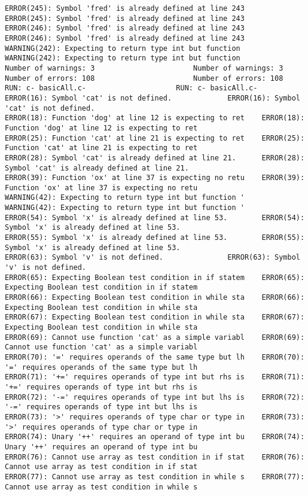 \documentclass[12pt]{book}
\begin{document}
\begin{lstlisting}
ERROR(245): Symbol 'fred' is already defined at line 243	ERROR(245): Symbol 'fred' is already defined at line 243
ERROR(246): Symbol 'fred' is already defined at line 243	ERROR(246): Symbol 'fred' is already defined at line 243
WARNING(242): Expecting to return type int but function 	WARNING(242): Expecting to return type int but function 
Number of warnings: 3						Number of warnings: 3
Number of errors: 108						Number of errors: 108
RUN: c- basicAll.c-						RUN: c- basicAll.c-
ERROR(16): Symbol 'cat' is not defined.				ERROR(16): Symbol 'cat' is not defined.
ERROR(18): Function 'dog' at line 12 is expecting to ret	ERROR(18): Function 'dog' at line 12 is expecting to ret
ERROR(25): Function 'cat' at line 21 is expecting to ret	ERROR(25): Function 'cat' at line 21 is expecting to ret
ERROR(28): Symbol 'cat' is already defined at line 21.		ERROR(28): Symbol 'cat' is already defined at line 21.
ERROR(39): Function 'ox' at line 37 is expecting no retu	ERROR(39): Function 'ox' at line 37 is expecting no retu
WARNING(42): Expecting to return type int but function '	WARNING(42): Expecting to return type int but function '
ERROR(54): Symbol 'x' is already defined at line 53.		ERROR(54): Symbol 'x' is already defined at line 53.
ERROR(55): Symbol 'x' is already defined at line 53.		ERROR(55): Symbol 'x' is already defined at line 53.
ERROR(63): Symbol 'v' is not defined.				ERROR(63): Symbol 'v' is not defined.
ERROR(65): Expecting Boolean test condition in if statem	ERROR(65): Expecting Boolean test condition in if statem
ERROR(66): Expecting Boolean test condition in while sta	ERROR(66): Expecting Boolean test condition in while sta
ERROR(67): Expecting Boolean test condition in while sta	ERROR(67): Expecting Boolean test condition in while sta
ERROR(69): Cannot use function 'cat' as a simple variabl	ERROR(69): Cannot use function 'cat' as a simple variabl
ERROR(70): '=' requires operands of the same type but lh	ERROR(70): '=' requires operands of the same type but lh
ERROR(71): '+=' requires operands of type int but rhs is	ERROR(71): '+=' requires operands of type int but rhs is
ERROR(72): '-=' requires operands of type int but lhs is	ERROR(72): '-=' requires operands of type int but lhs is
ERROR(73): '>' requires operands of type char or type in	ERROR(73): '>' requires operands of type char or type in
ERROR(74): Unary '++' requires an operand of type int bu	ERROR(74): Unary '++' requires an operand of type int bu
ERROR(76): Cannot use array as test condition in if stat	ERROR(76): Cannot use array as test condition in if stat
ERROR(77): Cannot use array as test condition in while s	ERROR(77): Cannot use array as test condition in while s

\end{lstlisting}
\end{document}

